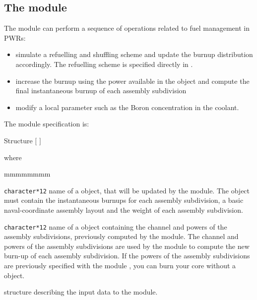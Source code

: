 \subsection{The  module}\label{sect:sim}

\vskip 0.2cm
The  module can perform a sequence of operations related to
fuel management in PWRs:
\begin{itemize}
\item simulate a refuelling and shuffling scheme and update the burnup distribution
accordingly. The refuelling scheme is specified directly in .
\item increase the burnup using the power available in the  object
and compute the final instantaneous burnup of each assembly subdivision
\item modify a local parameter such as the Boron concentration in the coolant.
\end{itemize}

\noindent
The  module specification is:

\begin{DataStructure}{Structure }
 \moc{:=}   $[$  $]$ \\
\moc{::} 
\end{DataStructure}

\noindent where

\begin{ListeDeDescription}{mmmmmmmm}

\item[\dusa{FMAP}] \texttt{character*12} name of a  object,
that will be updated by the  module. The  object
must contain the instantaneous burnups for each assembly subdivision, a basic naval-coordinate
assembly layout and the weight of each assembly subdivision.

\item[\dusa{POWER}] \texttt{character*12} name of a  object
containing the channel and powers of the assembly subdivisions, previously computed by the
 module. The channel and powers of the assembly subdivisions are used by the
 module to compute the new burn-up of each assembly subdivision. If the powers
of the assembly subdivisions are previously specified with the module , you can burn
your core without a  object.

\item[\dstr{descsim}] structure describing the input data to the  module.

\end{ListeDeDescription}

